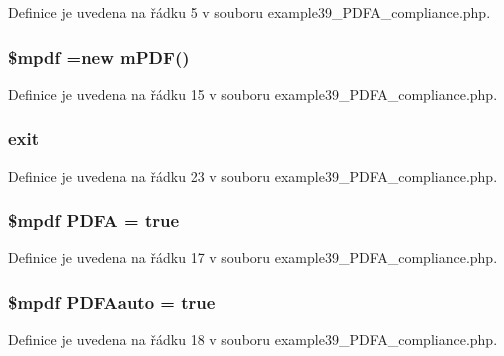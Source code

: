 Definice je uvedena na řádku 5 v souboru example39\-\_\-\-P\-D\-F\-A\-\_\-compliance.\-php.

\hypertarget{example39___p_d_f_a__compliance_8php_ad028f81910d6cbab9b184d2214b3a8f8}{
\subsubsection[{\$mpdf}]{\setlength{\rightskip}{0pt plus 5cm}\$mpdf =new {\bf m\-P\-D\-F}()}}\label{example39___p_d_f_a__compliance_8php_ad028f81910d6cbab9b184d2214b3a8f8}


Definice je uvedena na řádku 15 v souboru example39\-\_\-\-P\-D\-F\-A\-\_\-compliance.\-php.

\hypertarget{example39___p_d_f_a__compliance_8php_a6733eb5f605d09eaede9845835d71c4e}{
\subsubsection[{exit}]{\setlength{\rightskip}{0pt plus 5cm}exit}}\label{example39___p_d_f_a__compliance_8php_a6733eb5f605d09eaede9845835d71c4e}


Definice je uvedena na řádku 23 v souboru example39\-\_\-\-P\-D\-F\-A\-\_\-compliance.\-php.

\hypertarget{example39___p_d_f_a__compliance_8php_af1f0b2f4d30920065eee1b7a894814bf}{
\subsubsection[{P\-D\-F\-A}]{\setlength{\rightskip}{0pt plus 5cm}\$mpdf P\-D\-F\-A = true}}\label{example39___p_d_f_a__compliance_8php_af1f0b2f4d30920065eee1b7a894814bf}


Definice je uvedena na řádku 17 v souboru example39\-\_\-\-P\-D\-F\-A\-\_\-compliance.\-php.

\hypertarget{example39___p_d_f_a__compliance_8php_a3c2bbcdfcaa3db0addfcfd9c7b6175b2}{
\subsubsection[{P\-D\-F\-Aauto}]{\setlength{\rightskip}{0pt plus 5cm}\$mpdf P\-D\-F\-Aauto = true}}\label{example39___p_d_f_a__compliance_8php_a3c2bbcdfcaa3db0addfcfd9c7b6175b2}


Definice je uvedena na řádku 18 v souboru example39\-\_\-\-P\-D\-F\-A\-\_\-compliance.\-php.

